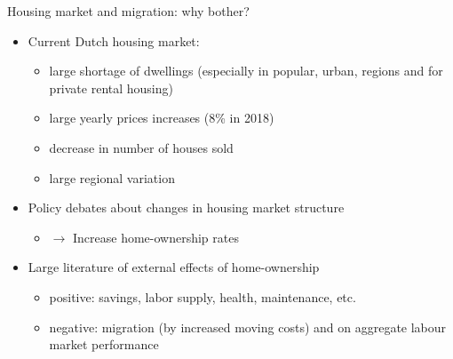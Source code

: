 \documentclass{beamer}
\begin{document}
\begin{frame}{Housing market and migration: why bother?}
   	\begin{itemize}
   		\item Current Dutch housing market:
   		\begin{itemize}
   			\item large \alert{shortage} of dwellings (especially in popular, urban, regions and for private rental housing)
   			\item large yearly prices \alert{increases} (8\% in 2018)
   			\item decrease in number of houses \alert{sold}
   			\item large \alert{regional} variation\newline
   		\end{itemize}
                \item Policy debates about changes in housing market \alert{structure}
                \begin{itemize}
                \item $\longrightarrow$ Increase home-ownership rates\newline
                \end{itemize}
   		\item Large literature of \alert{external} effects of home-ownership \footnotesize{\citep{dietz2003social}}
   		\begin{itemize}
   			\item \alert{positive}: savings, labor supply, health, maintenance, etc.
   			\item \alert{negative}: migration (by increased moving costs) and on aggregate labour market performance \footnotesize{\citep{oswald1996conjecture,oswald1999housing}}
   		\end{itemize}
   	\end{itemize}
\end{frame}
\end{document}
